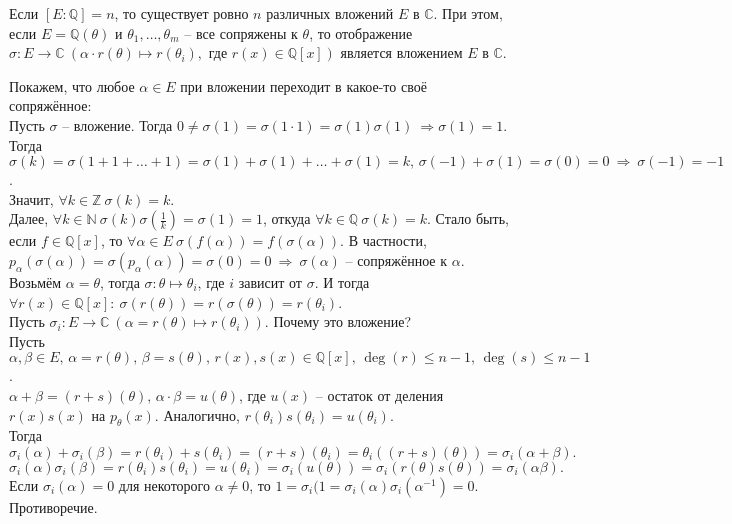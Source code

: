 \begin{theorem} \label{l12_th6}
	Если $[E \colon \mathbb{Q}] = n$, то существует ровно $n$ различных вложений $E$ в $\mathbb{C}$.
	При этом, если $E = \mathbb{Q}(\theta)$ и $\theta_1, \dots, \theta_m$ -- все сопряжены к $\theta$, то отображение $\sigma \colon E \to \mathbb{C} \ (\alpha \cdot r(\theta) \mapsto r(\theta_i), \text{ где } r(x)\in\mathbb{Q}[x])$ является вложением $E$ в $\mathbb{C}$.
\end{theorem}
\begin{pf}
	Покажем, что любое $\alpha \in E$ при вложении переходит в какое-то своё сопряжённое:\\
	Пусть $\sigma$ -- вложение. Тогда $0 \ne \sigma(1) = \sigma(1 \cdot 1) = \sigma(1)\sigma(1) \ \Rightarrow \sigma(1)=1$.\\
	Тогда $\sigma(k) = \sigma(1+1+\dots+1) = \sigma(1)+\sigma(1)+\dots+\sigma(1) = k, \, \sigma(-1)+\sigma(1)=\sigma(0)=0 \ \Rightarrow \ \sigma(-1)=-1$.\\
	Значит, $\forall k \in \mathbb{Z} \ \sigma(k)=k$.\\
	Далее, $\forall k \in \mathbb{N} \ \sigma(k)\sigma\left(\frac{1}{k}\right) = \sigma(1) = 1$, откуда $\forall k \in \mathbb{Q} \ \sigma(k)=k$. Стало быть, если $f \in \mathbb{Q}[x]$, то $\forall \alpha \in E \ \sigma(f(\alpha)) = f(\sigma(\alpha))$. В частности, $p_\alpha(\sigma(\alpha)) = \sigma(p_\alpha(\alpha)) = \sigma(0) = 0 \ \Rightarrow \ \sigma(\alpha)$ -- сопряжённое к $\alpha$.\\
	Возьмём $\alpha = \theta$, тогда $\sigma \colon \theta \mapsto \theta_i$, где $i$ зависит от $\sigma$. И тогда $\forall r(x) \in \mathbb{Q}[x]: \ \sigma(r(\theta)) = r(\sigma(\theta)) = r(\theta_i)$.\\
	Пусть $\sigma_i\colon E \to \mathbb{C} \ (\alpha = r(\theta) \mapsto r(\theta_i))$. Почему это вложение?\\
	Пусть $\alpha, \beta \in E, \, \alpha = r(\theta), \, \beta = s(\theta), \, r(x), s(x) \in \mathbb{Q}[x], \, \deg(r) \leq n-1, \, \deg(s) \leq n-1$.\\
	$\alpha + \beta = (r+s)(\theta), \, \alpha \cdot \beta = u(\theta)$, где $u(x)$ -- остаток от деления $r(x)s(x)$ на $p_\theta(x)$. Аналогично, $r(\theta_i)s(\theta_i) = u(\theta_i)$.\\
	Тогда
	$$\sigma_i(\alpha)+\sigma_i(\beta) = r(\theta_i)+s(\theta_i) = (r+s)(\theta_i) = \theta_i((r+s)(\theta)) = \sigma_i(\alpha+\beta).$$
	$$\sigma_i(\alpha)\sigma_i(\beta) = r(\theta_i)s(\theta_i) = u(\theta_i) = \sigma_i(u(\theta)) = \sigma_i(r(\theta)s(\theta)) = \sigma_i(\alpha\beta).$$
	Если $\sigma_i(\alpha) = 0$ для некоторого $\alpha \ne 0$, то $1=\sigma_i(1 =\sigma_i(\alpha)\sigma_i(\alpha^{-1})=0$.
	Противоречие.
\end{pf}

